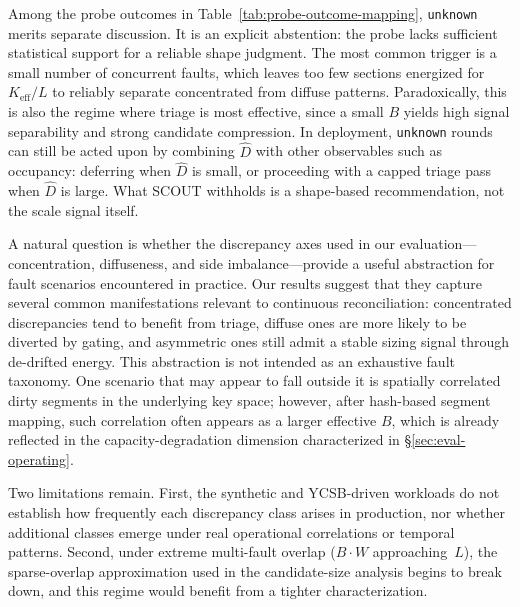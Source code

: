 Among the probe outcomes in Table~\ref{tab:probe-outcome-mapping}, \texttt{unknown} merits separate discussion. It is an explicit abstention:
  the probe lacks sufficient statistical support for a reliable shape judgment. The most common trigger is a small number of concurrent
faults, which leaves too few sections energized for $K_{\mathrm{eff}}/L$ to reliably separate concentrated from diffuse patterns.
Paradoxically, this is also the regime where triage is most effective, since a small $B$ yields high signal separability and strong candidate
  compression. In deployment, \texttt{unknown} rounds can still be acted upon by combining $\hat{D}$ with other observables such as occupancy:
  deferring when $\hat{D}$ is small, or proceeding with a capped triage pass when $\hat{D}$ is large. What SCOUT withholds is a shape-based
recommendation, not the scale signal itself.

A natural question is whether the discrepancy axes used
in our evaluation---concentration, diffuseness, and side
imbalance---provide a useful abstraction for fault scenarios
encountered in practice. Our results suggest that they capture
several common manifestations relevant to continuous
reconciliation: concentrated discrepancies tend to benefit
from triage, diffuse ones are more likely to be diverted by
gating, and asymmetric ones still admit a stable sizing signal
through de-drifted energy. This abstraction is not intended as
an exhaustive fault taxonomy. One scenario that may appear to
fall outside it is spatially correlated dirty segments in the
underlying key space; however, after hash-based segment
mapping, such correlation often appears as a larger effective
$B$, which is already reflected in the capacity-degradation
dimension characterized in \S\ref{sec:eval-operating}.


Two limitations remain. First, the synthetic and YCSB-driven
workloads do not establish how frequently each discrepancy
class arises in production, nor whether additional classes
emerge under real operational correlations or temporal
patterns. Second, under extreme multi-fault overlap
($B \cdot W$ approaching~$L$), the sparse-overlap
approximation used in the candidate-size analysis begins to
break down, and this regime would benefit from a tighter
characterization.
